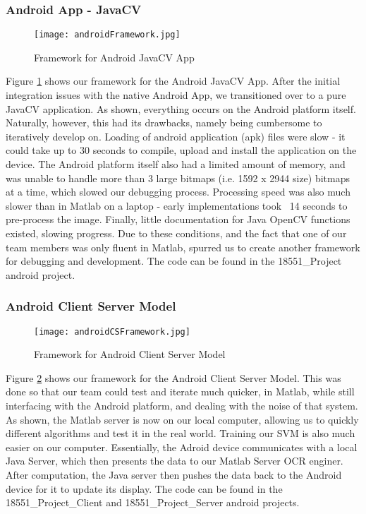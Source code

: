 \subsubsection{Android App - JavaCV}
\begin{figure}[h]
	\texttt{[image: androidFramework.jpg]}\\
	\caption{Framework for Android JavaCV App}
	\label{fig:androidFramework}
\end{figure}
Figure \ref{fig:androidFramework}  shows our framework for the Android JavaCV App. After the initial integration issues
with the native Android App, we transitioned over to a pure JavaCV application. As shown, everything occurs
on the Android platform itself. Naturally, however, this had its drawbacks, namely being cumbersome to iteratively
develop on. Loading of android application (apk) files were slow - it could take up to 30 seconds to compile, upload
and install the application on the device. The Android platform itself also had a limited amount of memory, and
was unable to handle more than 3 large bitmaps (i.e. 1592 x 2944 size) bitmaps at a time, which slowed our debugging
process. Processing speed was also much slower than in Matlab on a laptop - early implementations took ~14 seconds to
pre-process the image. Finally, little documentation for Java OpenCV functions existed, slowing progress. Due to these
conditions, and the fact that one of our team members was only fluent in Matlab, spurred us to create another framework
for debugging and development. The code can be found in the 18551\_Project android project.

\subsubsection{Android Client Server Model}
\begin{figure}[h]
	\texttt{[image: androidCSFramework.jpg]}\\
	\caption{Framework for Android Client Server Model}
	\label{fig:androidCSFramework}
\end{figure}
Figure \ref{fig:androidCSFramework} shows our framework for the Android Client Server Model. This was done so that our team could test
and iterate much quicker, in Matlab, while still interfacing with the Android platform, and dealing with the noise
of that system. As shown, the Matlab server is now on our local computer, allowing us to quickly different algorithms
and test it in the real world. Training our SVM is also much easier on our computer. Essentially, the Adroid device
communicates with a local Java Server, which then presents the data to our Matlab Server OCR enginer. After computation,
the Java server then pushes the data back to the Android device for it to update its display. The code can be found 
in the 18551\_Project\_Client and 18551\_Project\_Server android projects.

